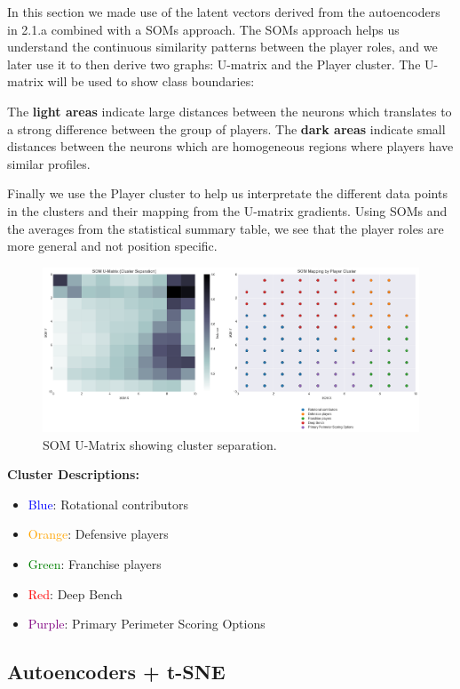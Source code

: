 \documentclass{article}
\begin{document}
In this section we made use of the latent vectors derived from the autoencoders in 2.1.a combined with a SOMs approach.
The SOMs approach helps us understand the continuous similarity patterns between the player roles, and we later use it to then derive two graphs: U-matrix and the Player cluster. The U-matrix will be used to show class boundaries:

The {\bf light areas} indicate large distances between the neurons which translates to a strong difference between the group of players.
The {\bf dark areas} indicate small distances between the neurons which are homogeneous regions where players have similar profiles.

Finally we use the Player cluster to help us interpretate the different data points in the clusters and their mapping from the U-matrix gradients. Using SOMs and the averages from the statistical summary table, we see that the player roles are more general and not position specific.

\begin{figure}[h]
    \centering
    \includegraphics[width=0.7\linewidth]{media/2b.png}
    \caption{SOM U-Matrix showing cluster separation.}
\end{figure}

{\bf Cluster Descriptions:}
\begin{itemize}
    \item \textcolor{blue}{Blue}: Rotational contributors
    \item \textcolor{orange}{Orange}: Defensive players
    \item \textcolor{green}{Green}: Franchise players
    \item \textcolor{red}{Red}: Deep Bench
    \item \textcolor{purple}{Purple}: Primary Perimeter Scoring Options
\end{itemize}

\subsection{Autoencoders + t-SNE}
\end{document}
